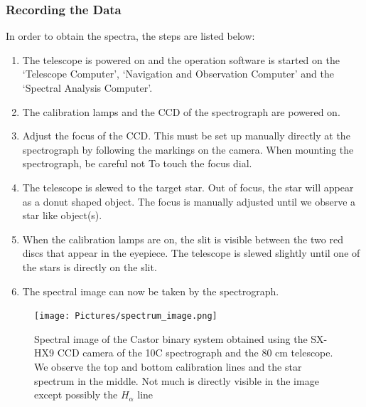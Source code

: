 \documentclass[12pt,a4paper]{article}
\begin{document}
    \subsubsection{Recording the Data}
      In order to obtain the spectra, the steps are listed below:
      \begin{enumerate}
        \item The telescope is powered on and the operation software is started on the `Telescope Computer', `Navigation and Observation Computer' and the `Spectral Analysis Computer'.
        \item The calibration lamps and the CCD of the spectrograph are powered on.
        \item Adjust the focus of the CCD. This must be set up manually directly at the spectrograph by following the markings on the camera. When mounting the spectrograph, be careful not To
              touch the focus dial.
        \item The telescope is slewed to the target star. Out of focus, the star will appear as a donut shaped object. The focus is manually adjusted until we observe a star like object(s).
        \item When the calibration lamps are on, the slit is visible between the two red discs that appear in the eyepiece. The telescope is slewed slightly until one of the stars is directly on the slit. 
        \item The spectral image can now be taken by the spectrograph. 
      \end{enumerate}

      \begin{figure}[H]
        \centering
        \texttt{[image: Pictures/spectrum\_image.png]}
        \caption{Spectral image of the Castor binary system obtained using the SX-HX9 CCD camera of the 10C spectrograph and the 80 cm telescope. 
        We observe the top and bottom calibration lines and the star spectrum in the middle. Not much is directly visible in the image except possibly the $H_\alpha$ line}
        \label{spectrum_img} 
      \end{figure}
\end{document}
